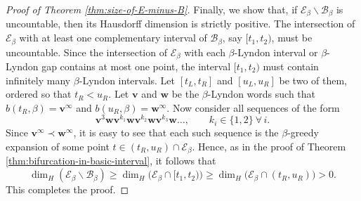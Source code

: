 \documentclass[11pt]{amsart}
\theoremstyle{definition}
\theoremstyle{remark}
\numberwithin{equation}{section}
\newcommand{\BB}{\mathscr{B}}
\newcommand{\EE}{\mathscr{E}}
\renewcommand{\v}{\mathbf{v}}
\newcommand{\w}{\mathbf{w}}
\newcommand{\f}{\infty}
\begin{document}
\begin{proof}[Proof of Theorem \ref{thm:size-of-E-minus-B}]
Finally, we show that, if $\EE_\beta\backslash\BB_\beta$ is uncountable, then its Hausdorff dimension is strictly positive. The intersection of $\EE_\beta$ with at least one complementary interval of $\BB_\beta$, say $[t_1,t_2)$, must be uncountable. Since the intersection of $\EE_\beta$ with each $\beta$-Lyndon interval or $\beta$-Lyndon gap contains at most one point, the interval $[t_1,t_2)$ must contain infinitely many $\beta$-Lyndon intervals. Let $[t_L,t_R]$ and $[u_L,u_R]$ be two of them, ordered so that $t_R<u_R$. Let $\v$ and $\w$ be the $\beta$-Lyndon words such that $b(t_R,\beta)=\v^\f$ and $b(u_R,\beta)=\w^\f$. Now consider all sequences of the form
\[
\v^3 \w\v^{k_1}\w\v^{k_2}\w\v^{k_3}\w\dots, \qquad k_i\in\{1,2\}\ \forall\,i.
\]
Since $\v^\f\prec \w^\f$, it is easy to see that each such sequence is the $\beta$-greedy expansion of some point $t\in(t_R,u_R)\cap\EE_\beta$. Hence, as in the proof of Theorem \ref{thm:bifurcation-in-basic-interval}, it follows that
\[
\dim_H(\EE_\beta\backslash\BB_\beta) \geq \dim_H\big(\EE_\beta\cap[t_1,t_2)\big) \geq \dim_H\big(\EE_\beta\cap(t_R,u_R)\big)>0.
\]
This completes the proof.
\end{proof}
\end{document}
